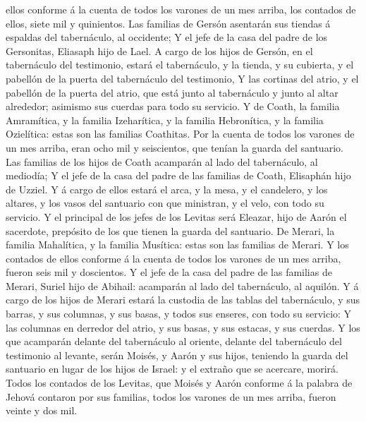 ellos conforme á la cuenta de todos los varones de un mes arriba, los
contados de ellos, siete mil y quinientos.  Las familias
de Gersón asentarán sus tiendas á espaldas del tabernáculo, al
occidente;  Y el jefe de la casa del padre de los
Gersonitas, Eliasaph hijo de Lael.  A cargo de los hijos
de Gersón, en el tabernáculo del testimonio, estará el tabernáculo, y la
tienda, y su cubierta, y el pabellón de la puerta del tabernáculo del
testimonio,  Y las cortinas del atrio, y el pabellón de
la puerta del atrio, que está junto al tabernáculo y junto al altar
alrededor; asimismo sus cuerdas para todo su servicio.  Y
de Coath, la familia Amramítica, y la familia Izeharítica, y la familia
Hebronítica, y la familia Ozielítica: estas son las familias Coathitas.
 Por la cuenta de todos los varones de un mes arriba,
eran ocho mil y seiscientos, que tenían la guarda del santuario.
 Las familias de los hijos de Coath acamparán al lado del
tabernáculo, al mediodía;  Y el jefe de la casa del padre
de las familias de Coath, Elisaphán hijo de Uzziel.  Y á
cargo de ellos estará el arca, y la mesa, y el candelero, y los altares,
y los vasos del santuario con que ministran, y el velo, con todo su
servicio.  Y el principal de los jefes de los Levitas
será Eleazar, hijo de Aarón el sacerdote, prepósito de los que tienen la
guarda del santuario.  De Merari, la familia Mahalítica,
y la familia Musítica: estas son las familias de Merari. 
Y los contados de ellos conforme á la cuenta de todos los varones de un
mes arriba, fueron seis mil y doscientos.  Y el jefe de
la casa del padre de las familias de Merari, Suriel hijo de Abihail:
acamparán al lado del tabernáculo, al aquilón.  Y á cargo
de los hijos de Merari estará la custodia de las tablas del tabernáculo,
y sus barras, y sus columnas, y sus basas, y todos sus enseres, con todo
su servicio:  Y las columnas en derredor del atrio, y sus
basas, y sus estacas, y sus cuerdas.  Y los que acamparán
delante del tabernáculo al oriente, delante del tabernáculo del
testimonio al levante, serán Moisés, y Aarón y sus hijos, teniendo la
guarda del santuario en lugar de los hijos de Israel: y el extraño que
se acercare, morirá.  Todos los contados de los Levitas,
que Moisés y Aarón conforme á la palabra de Jehová contaron por sus
familias, todos los varones de un mes arriba, fueron veinte y dos mil.
